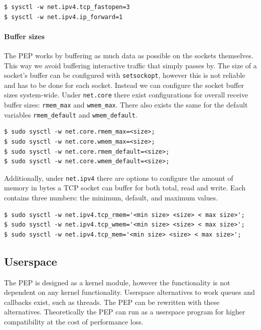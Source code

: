 \documentclass[a4paper,english, 11pt]{report}
\begin{document}
\begin{verbatim}
$ sysctl -w net.ipv4.tcp_fastopen=3
$ sysctl -w net.ipv4.ip_forward=1 
\end{verbatim}

\paragraph{Buffer sizes}
The PEP works by buffering as much data as possible on the sockets themselves. This way we avoid buffering interactive traffic that simply passes by. The size of a socket's buffer can be configured with \verb|setsockopt|, however this is not reliable and has to be done for each socket. Instead we can configure the socket buffer sizes system-wide. Under \verb|net.core| there exist configurations for overall receive buffer sizes: \verb|rmem_max| and \verb|wmem_max|. There also exists the same for the default variables \verb|rmem_default| and \verb|wmem_default|.\\

\begin{verbatim}
$ sudo sysctl -w net.core.rmem_max=<size>;
$ sudo sysctl -w net.core.wmem_max=<size>;
$ sudo sysctl -w net.core.rmem_default=<size>;
$ sudo sysctl -w net.core.wmem_default=<size>;
\end{verbatim}

Additionally, under \verb|net.ipv4| there are options to configure the amount of memory in bytes a TCP socket can buffer for both total, read and write. Each contains three numbers: the minimum, default, and maximum values.


\begin{verbatim}
$ sudo sysctl -w net.ipv4.tcp_rmem='<min size> <size> < max size>';
$ sudo sysctl -w net.ipv4.tcp_wmem='<min size> <size> < max size>';
$ sudo sysctl -w net.ipv4.tcp_mem='<min size> <size> < max size>';
\end{verbatim}

\subsection{Userspace}
The PEP is designed as a kernel module, however the functionality is not dependent on any kernel functionality. Userspace alternatives to work queues and callbacks exist, such as threads. The PEP can be rewritten with these alternatives. Theoretically the PEP can run as a userspace program for higher compatibility at the cost of performance loss.
\end{document}
